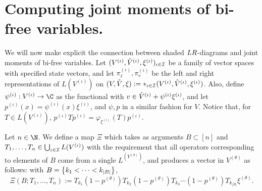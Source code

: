 \section{Computing joint moments of bi-free variables.}
We will now make explicit the connection between shaded $LR$-diagrams and joint moments of bi-free variables.
Let $(V^{(\iota)}, \mathring{V}^{(\iota)}, \xi^{(\iota)})_{\iota\in\mathcal{I}}$ be a family of vector spaces with specified state vectors, and let $\pi_\ell^{(\iota)}, \pi_r^{(\iota)}$ be the left and right representations of $L(V^{(\iota)})$ on $(V, \mathring{V}, \xi) := \mathop{\ast}_{\iota\in\mathcal{I}}(V^{(\iota)}, \mathring{V}^{(\iota)}, \xi^{(\iota)})$.
Also, define $\psi^{(\iota)} : V^{(\iota)} \to \C$ as the functional with $v \in \mathring{V}^{(\iota)} + \psi^{(\iota)}\xi^{(\iota)}$, and let $p^{(\iota)}(x) = \psi^{(\iota)}(x)\xi^{(\iota)}$, and $\psi, p$ in a similar fashion for $V$.
Notice that, for $T \in L(V^{(\iota)})$, $p^{(\iota)}Tp^{(\iota)} = \varphi_{\xi^{(\iota)}}(T)p^{(\iota)}$.

Let $n \in \N$.
We define a map $\Xi$ which takes as arguments $B \subset [n]$ and $T_1, \ldots, T_n \in \bigcup_{\iota\in\mathcal{I}}L(V^{(\iota)})$ with the requirement that all operators corresponding to elements of $B$ come from a single $L^(V^{(\theta)})$, and produces a vector in $V^{(\theta)}$ as follows:
with $B = \left\{k_1 < \cdots < k_{|B|}\right\}$,
$$\Xi(B; T_1, \ldots, T_n) := T_{k_1}(1-p^{(\theta)})T_{k_2}(1-p^{(\theta)})T_{k_3}\cdots(1-p^{(\theta)})T_{k_{|B|}}\xi^{(\theta)}.$$

